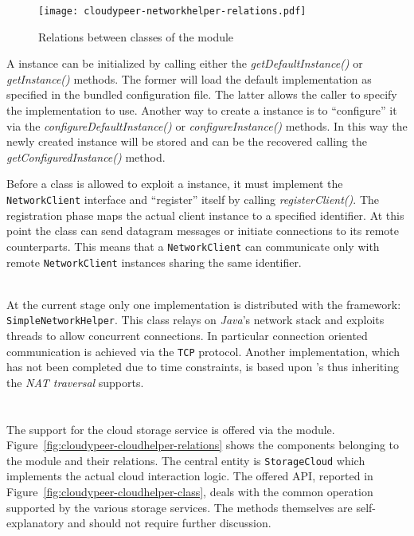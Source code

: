 \begin{figure}[h!]
  \centering
  \texttt{[image: cloudypeer-networkhelper-relations.pdf]}
  \caption{Relations between classes of the \networkhelper module}
  \label{fig:cloudypeer-nethelper-relations}
\end{figure}

A \networkhelper instance can be initialized by calling either the
\textit{getDefaultInstance()} or \textit{getInstance()} methods. The former
will load the default implementation as specified in the bundled
configuration file. The latter allows the caller to specify the
implementation to use. Another way to create a \networkhelper instance
is to ``configure'' it via the \textit{configureDefaultInstance()} or
\textit{configureInstance()} methods. In this way the newly created
instance will be stored and can be the recovered calling the
\textit{getConfiguredInstance()} method.

Before a class is allowed to exploit a \networkhelper instance, it must
implement the \texttt{NetworkClient} interface and
``register'' itself by calling \textit{registerClient()}. The
registration phase maps the actual client instance to a specified
identifier. At this point the class can send datagram messages or
initiate connections to its remote counterparts. This means that a
\texttt{NetworkClient} can communicate only with remote
\texttt{NetworkClient} instances sharing the same identifier.

\ \\
At the current stage only one \networkhelper implementation is
distributed with the framework: \texttt{SimpleNetworkHelper}. This class
relays on \emph{Java}'s network stack and exploits threads to allow
concurrent connections. In particular connection oriented
communication is achieved via the \texttt{TCP} protocol.
Another implementation, which has not been completed due to time
constraints, is based upon \grapes's \networkhelper thus inheriting
the \emph{NAT traversal} supports.

\section{\cloudhelper}
The support for the cloud storage service is offered via the
\cloudhelper module. Figure~\ref{fig:cloudypeer-cloudhelper-relations}
shows the components belonging to the module and their relations.
The central entity is \texttt{StorageCloud} which
implements the actual cloud interaction logic. The offered API, reported
in Figure~\ref{fig:cloudypeer-cloudhelper-class}, deals with the
common operation supported by the various storage services. The
methods themselves are self-explanatory and should not require further
discussion.


